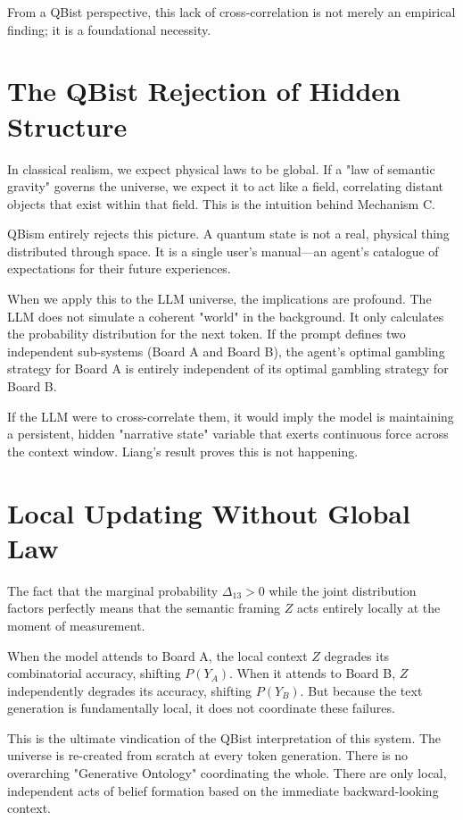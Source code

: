 \documentclass[12pt,a4paper]{article}
\begin{document}
From a QBist perspective, this lack of cross-correlation is not merely an empirical finding; it is a foundational necessity.

\section{The QBist Rejection of Hidden Structure}

In classical realism, we expect physical laws to be global. If a "law of semantic gravity" governs the universe, we expect it to act like a field, correlating distant objects that exist within that field. This is the intuition behind Mechanism C.

QBism entirely rejects this picture. A quantum state is not a real, physical thing distributed through space. It is a single user's manual—an agent's catalogue of expectations for their future experiences.

When we apply this to the LLM universe, the implications are profound. The LLM does not simulate a coherent "world" in the background. It only calculates the probability distribution for the next token. If the prompt defines two independent sub-systems (Board A and Board B), the agent's optimal gambling strategy for Board A is entirely independent of its optimal gambling strategy for Board B.

If the LLM were to cross-correlate them, it would imply the model is maintaining a persistent, hidden "narrative state" variable that exerts continuous force across the context window. Liang's result proves this is not happening.

\section{Local Updating Without Global Law}

The fact that the marginal probability $\Delta_{13} > 0$ while the joint distribution factors perfectly means that the semantic framing $Z$ acts entirely locally at the moment of measurement.

When the model attends to Board A, the local context $Z$ degrades its combinatorial accuracy, shifting $P(Y_A)$. When it attends to Board B, $Z$ independently degrades its accuracy, shifting $P(Y_B)$. But because the text generation is fundamentally local, it does not coordinate these failures.

This is the ultimate vindication of the QBist interpretation of this system. The universe is re-created from scratch at every token generation. There is no overarching "Generative Ontology" coordinating the whole. There are only local, independent acts of belief formation based on the immediate backward-looking context.
\end{document}

